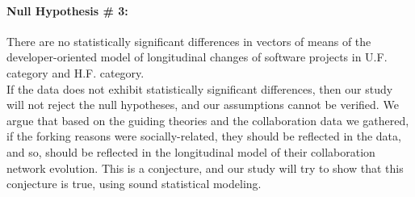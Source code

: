 \documentclass[12pt]{report}
\begin{document}
\paragraph*{Null Hypothesis \# 3:} 
\hspace{10 mm} There are no statistically significant differences in vectors of means of the developer-oriented model of longitudinal changes of software projects in U.F. category and H.F. category.\\

If the data does not exhibit statistically significant differences, then our study will not reject the null hypotheses, and our assumptions cannot be verified. We argue that based on the guiding theories and the collaboration data we gathered, if the forking reasons were socially-related, they should be reflected in the data, and so, should be reflected in the longitudinal model of their collaboration network evolution. This is a conjecture, and our study will try to show that this conjecture is true, using sound statistical modeling.

%
%
%
\end{document}
